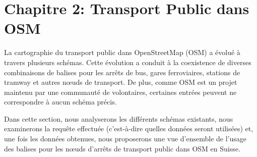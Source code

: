 \chapter{Chapitre 2: Transport Public dans OSM}

La cartographie du transport public dans OpenStreetMap (OSM) a évolué à travers plusieurs schémas. Cette évolution a conduit à la coexistence de diverses combinaisons de balises pour les arrêts de bus, gares ferroviaires, stations de tramway et autres nœuds de transport. De plus, comme OSM est un projet maintenu par une communauté de volontaires, certaines entrées peuvent ne correspondre à aucun schéma précis.

Dans cette section, nous analyserons les différents schémas existants, nous examinerons la requête effectuée (c'est-à-dire quelles données seront utilisées) et, une fois les données obtenues, nous proposerons une vue d'ensemble de l'usage des balises pour les nœuds d'arrêts de transport public dans OSM en Suisse.

